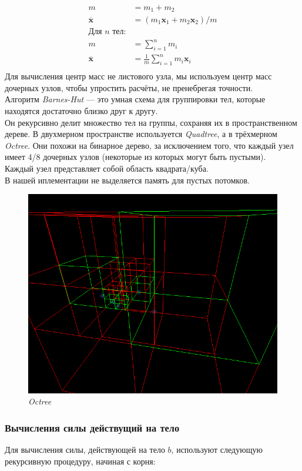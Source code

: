 \documentclass{article}
\begin{document}
\begin{align*}
  m &= m_1 + m_2\\
  \overline{\mathbf{x}} &= (m_1\mathbf{x}_1 + m_2\mathbf{x}_2) / m\\
  \text{Для $n$ тел:}&\\
  m &= \sum^{n}_{i = 1}{m_i}\\
  \overline{\mathbf{x}} &= \frac{1}{m}\sum^{n}_{i = 1}{m_i\mathbf{x}_i}\\
\end{align*}
Для вычисления центр масс не листового узла, мы используем центр масс дочерных узлов, чтобы упростить расчёты, не пренебрегая точности.\\[\baselineskip]
Алгоритм \textit{Barnes-Hut} --- это умная схема для группировки тел, которые находятся достаточно близко друг к другу.\\
Он рекурсивно делит множество тел на группы, сохраняя их в пространственном дереве.
В двухмерном пространстве используется \textit{Quadtree}, а в трёхмерном \textit{Octree}. Они похожи на бинарное дерево, за исключением того, что каждый узел имеет 4/8 дочерных узлов (некоторые из которых могут быть пустыми).\\
Каждый узел представляет собой область квадрата/куба.\\
В нашей иплементации не выделяется память для пустых потомков.\\

\begin{figure}[H]
  \centering
  \includegraphics[width=0.7\linewidth]{../images/octree2.png}
  \caption{\textit{Octree}}
  \label{fig:octree}
\end{figure}

\subsubsection*{Вычисления силы действущий на тело}
Для вычисления силы, действующей на тело $b$, используют следующую рекурсивную процедуру, начиная с корня:
\end{document}
